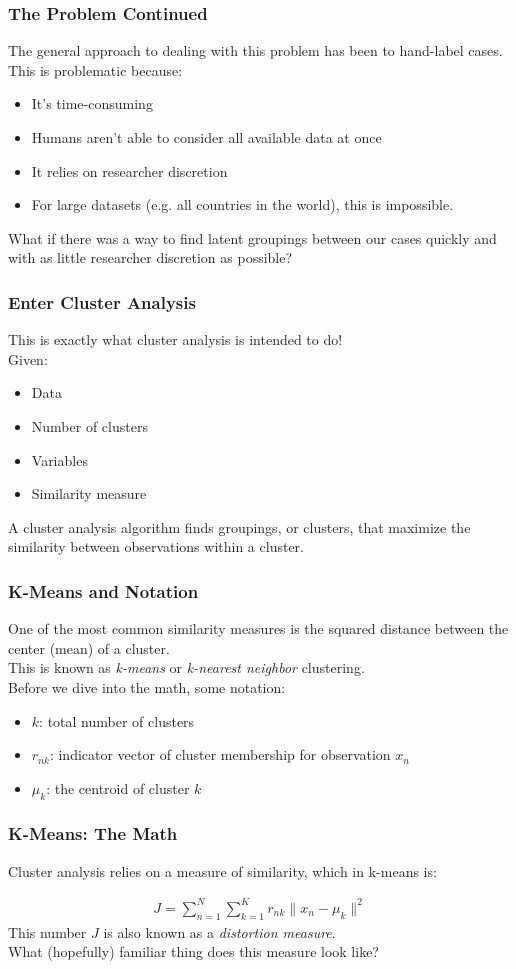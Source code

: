 \documentclass{beamer}
\begin{document}
\begin{frame}
\frametitle{The Problem Continued}
	The general approach to dealing with this problem has been to hand-label cases. This is problematic because:
	\begin{itemize}
		\item It's time-consuming
		\item Humans aren't able to consider all available data at once
		\item It relies on researcher discretion
		\item For large datasets (e.g. all countries in the world), this is impossible.
	\end{itemize}
	What if there was a way to find latent groupings between our cases quickly and with as little researcher discretion as possible?
\end{frame}

\begin{frame}
\frametitle{Enter Cluster Analysis}
	This is exactly what cluster analysis is intended to do!\\
	Given:
	\begin{itemize}
		\item Data
		\item Number of clusters
		\item Variables
		\item Similarity measure
	\end{itemize}
	A cluster analysis algorithm finds groupings, or clusters, that maximize the similarity between observations within a cluster. 
\end{frame}

\begin{frame}
\frametitle{K-Means and Notation}
	One of the most common similarity measures is the squared distance between the center (mean) of a cluster. \\
	This is known as \textit{k-means} or \textit{k-nearest neighbor} clustering.\\
	Before we dive into the math, some notation:
	\begin{itemize}
		\item $k$: total number of clusters
		\item $r_{nk}$: indicator vector of cluster membership for observation $x_n$
		\item $\mu_k$: the centroid of cluster $k$
	\end{itemize}
\end{frame}

\begin{frame}
\frametitle{K-Means: The Math}
	Cluster analysis relies on a measure of similarity, which in k-means is:
	
	\begin{align*}
	J = \sum_{n=1}^{N}\sum_{k=1}^{K} r_{nk}  \| x_n - \mu_k \|^2
	\end{align*}
	This number $J$ is also known as a \textit{distortion measure}.\\
	What (hopefully) familiar thing does this measure look like?
\end{frame}
\end{document}
